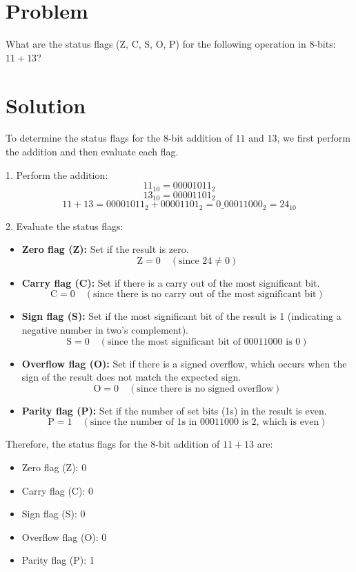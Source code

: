 \section*{Problem}
What are the status flags (Z, C, S, O, P) for the following operation in 8-bits: \(11 + 13\)?

\section*{Solution}
To determine the status flags for the 8-bit addition of \(11\) and \(13\), we first perform the addition and then evaluate each flag.

1. Perform the addition:
\[
11_{10} = 00001011_2
\]
\[
13_{10} = 00001101_2
\]
\[
11 + 13 = 00001011_2 + 00001101_2 = 0\_00011000_2 = 24_{10}
\]

2. Evaluate the status flags:
\begin{itemize}
    \item \textbf{Zero flag (Z):} Set if the result is zero.
    \[
    \text{Z} = 0 \quad (\text{since } 24 \neq 0)
    \]

    \item \textbf{Carry flag (C):} Set if there is a carry out of the most significant bit.
    \[
    \text{C} = 0 \quad (\text{since there is no carry out of the most significant bit})
    \]

    \item \textbf{Sign flag (S):} Set if the most significant bit of the result is 1 (indicating a negative number in two's complement).
    \[
    \text{S} = 0 \quad (\text{since the most significant bit of 00011000 is 0})
    \]

    \item \textbf{Overflow flag (O):} Set if there is a signed overflow, which occurs when the sign of the result does not match the expected sign.
    \[
    \text{O} = 0 \quad (\text{since there is no signed overflow})
    \]

    \item \textbf{Parity flag (P):} Set if the number of set bits (1s) in the result is even.
    \[
    \text{P} = 1 \quad (\text{since the number of 1s in 00011000 is 2, which is even})
    \]
\end{itemize}

Therefore, the status flags for the 8-bit addition of \(11 + 13\) are:
\begin{itemize}
    \item Zero flag (Z): 0
    \item Carry flag (C): 0
    \item Sign flag (S): 0
    \item Overflow flag (O): 0
    \item Parity flag (P): 1
\end{itemize}